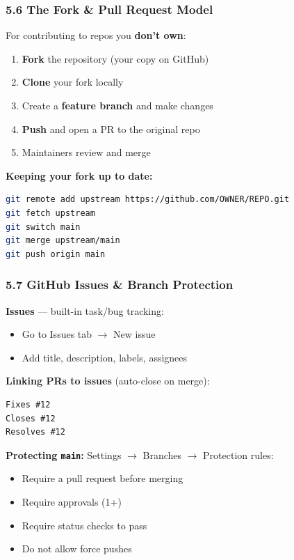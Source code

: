 \documentclass{beamer}
\begin{document}
\begin{frame}[fragile]
\frametitle{5.6 The Fork \& Pull Request Model}

For contributing to repos you \textbf{don't own}:
\begin{enumerate}
    \item \textbf{Fork} the repository (your copy on GitHub)
    \item \textbf{Clone} your fork locally
    \item Create a \textbf{feature branch} and make changes
    \item \textbf{Push} and open a PR to the original repo
    \item Maintainers review and merge
\end{enumerate}

\vspace{2mm}
\textbf{Keeping your fork up to date:}
\begin{lstlisting}[language=bash]
git remote add upstream https://github.com/OWNER/REPO.git
git fetch upstream
git switch main
git merge upstream/main
git push origin main
\end{lstlisting}
\end{frame}

\begin{frame}[fragile]
\frametitle{5.7 GitHub Issues \& Branch Protection}

\textbf{Issues} --- built-in task/bug tracking:
\begin{itemize}
    \item Go to Issues tab $\rightarrow$ New issue
    \item Add title, description, labels, assignees
\end{itemize}

\vspace{2mm}
\textbf{Linking PRs to issues} (auto-close on merge):
\begin{lstlisting}
Fixes #12
Closes #12
Resolves #12
\end{lstlisting}

\vspace{2mm}
\textbf{Protecting \texttt{main}:} Settings $\rightarrow$ Branches $\rightarrow$ Protection rules:
\begin{itemize}
    \item Require a pull request before merging
    \item Require approvals (1+)
    \item Require status checks to pass
    \item Do not allow force pushes
\end{itemize}
\end{frame}
\end{document}
